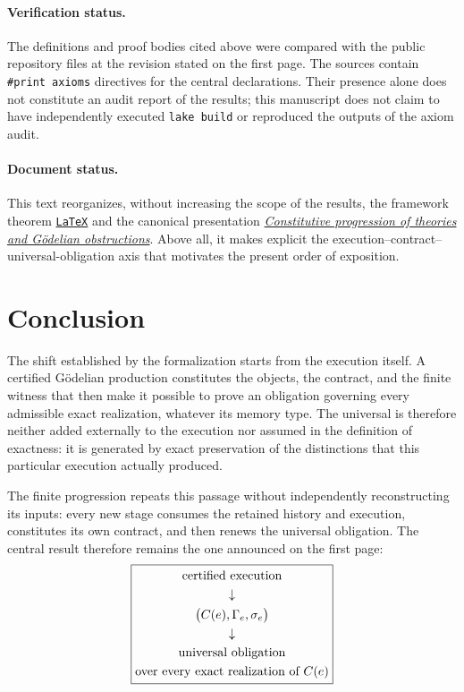 \documentclass[11pt,a4paper]{article}
\newcommand{\Source}[2]{\href{https://github.com/JohnDoe-collab-stack/relational-perimeter/blob/1e5aeda745559d62a3819bb3213da7fce3c31ad1/#1}{\nolinkurl{#2}}}
\newcommand{\MainAxis}{%
  \begin{gathered}
  \text{certified execution}\\
  \downarrow\\
  \bigl(C(e),\Gamma_e,\sigma_e\bigr)\\
  \downarrow\\
  \text{universal obligation}\\
  \text{over every exact realization of }C(e)
  \end{gathered}}
\theoremstyle{remark}
\begin{document}
\paragraph{Verification status.}
The definitions and proof bodies cited above were compared with the public
repository files at the revision stated on the first page. The sources
contain \texttt{\#print axioms} directives for the central declarations.
Their presence alone does not constitute an audit report of the results;
this manuscript does not claim to have independently executed
\texttt{lake build} or reproduced the outputs of the axiom audit.

\paragraph{Document status.}
This text reorganizes, without increasing the scope of the results, the
framework theorem
\Source{docs/theoreme-cadre-progression-godelienne-separation-exacte.fr.tex}{LaTeX}
and the canonical presentation
\href{https://github.com/JohnDoe-collab-stack/relational-perimeter/blob/1e5aeda745559d62a3819bb3213da7fce3c31ad1/docs/progression-constitutive-theories-godeliennes.fr.md}{\emph{Constitutive progression of theories and Gödelian obstructions}}.
Above all, it makes explicit the execution--contract--universal-obligation
axis that motivates the present order of exposition.

\section{Conclusion}

The shift established by the formalization starts from the execution
itself. A certified Gödelian production constitutes the objects, the
contract, and the finite witness that then make it possible to prove an
obligation governing every admissible exact realization, whatever its
memory type. The universal is therefore neither added externally to the
execution nor assumed in the definition of exactness: it is generated by
exact preservation of the distinctions that this particular execution
actually produced.

The finite progression repeats this passage without independently
reconstructing its inputs: every new stage consumes the retained history and
execution, constitutes its own contract, and then renews the universal
obligation. The central result therefore remains the one announced on the
first page:
\[
\boxed{\MainAxis}
\]
\end{document}
